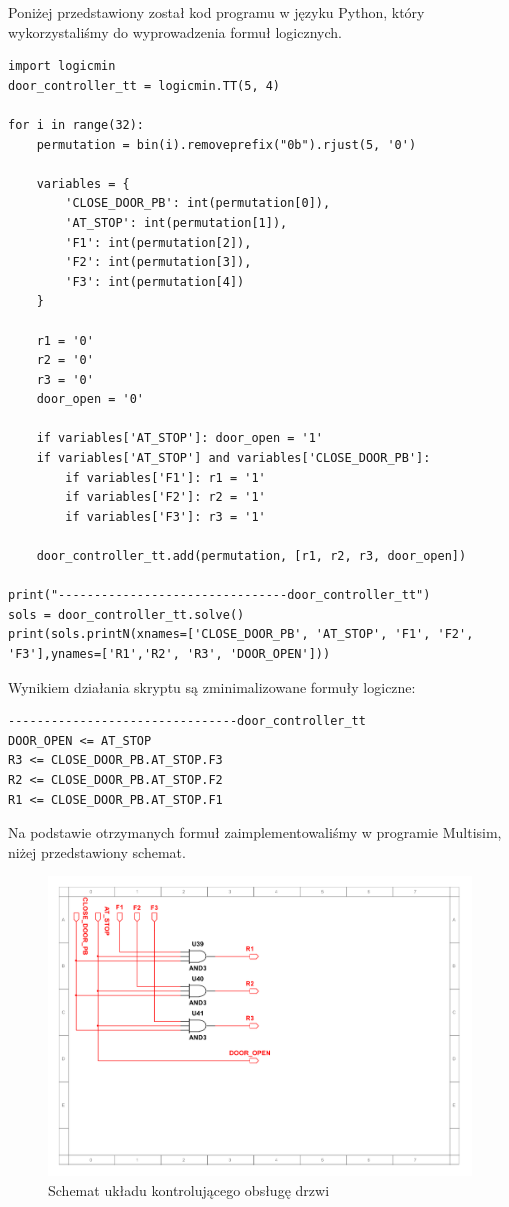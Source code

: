 \documentclass[a4paper]{article}
\begin{document}
Poniżej przedstawiony został kod programu w języku Python, który wykorzystaliśmy do wyprowadzenia
formuł logicznych.
\begin{verbatim}
import logicmin
door_controller_tt = logicmin.TT(5, 4)

for i in range(32):
    permutation = bin(i).removeprefix("0b").rjust(5, '0')
    
    variables = {
        'CLOSE_DOOR_PB': int(permutation[0]),
        'AT_STOP': int(permutation[1]),
        'F1': int(permutation[2]),
        'F2': int(permutation[3]),
        'F3': int(permutation[4])
    }

    r1 = '0'
    r2 = '0'
    r3 = '0'
    door_open = '0'

    if variables['AT_STOP']: door_open = '1'
    if variables['AT_STOP'] and variables['CLOSE_DOOR_PB']:
        if variables['F1']: r1 = '1'
        if variables['F2']: r2 = '1'
        if variables['F3']: r3 = '1'

    door_controller_tt.add(permutation, [r1, r2, r3, door_open])

print("--------------------------------door_controller_tt")
sols = door_controller_tt.solve()
print(sols.printN(xnames=['CLOSE_DOOR_PB', 'AT_STOP', 'F1', 'F2', 'F3'],ynames=['R1','R2', 'R3', 'DOOR_OPEN']))
\end{verbatim}
Wynikiem działania skryptu są zminimalizowane formuły logiczne:

\begin{verbatim}
--------------------------------door_controller_tt
DOOR_OPEN <= AT_STOP
R3 <= CLOSE_DOOR_PB.AT_STOP.F3
R2 <= CLOSE_DOOR_PB.AT_STOP.F2
R1 <= CLOSE_DOOR_PB.AT_STOP.F1
\end{verbatim}

Na podstawie otrzymanych formuł zaimplementowaliśmy w programie Multisim,
niżej przedstawiony schemat.

\begin{figure}[H]
    \centering
    \includegraphics[width=\textwidth]{door_controller_schemat.pdf}
    \caption{Schemat układu kontrolującego obsługę drzwi}
\end{figure}
\end{document}
